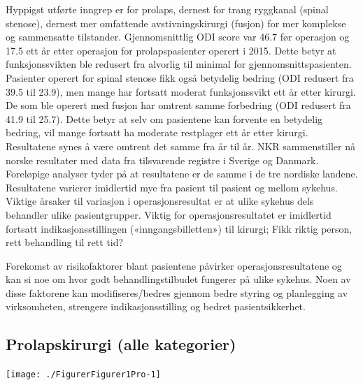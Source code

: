 \documentclass [norsk,a4paper,twoside]{article}\usepackage[]{graphicx}\usepackage[]{color}
\newenvironment{knitrout}{}{} %
\begin{document}
Hyppigst utførte inngrep er for prolaps, dernest for trang ryggkanal (spinal stenose),
dernest mer omfattende avstivningskirurgi (fusjon) for mer komplekse og
sammensatte tilstander. 
Gjennomsnittlig ODI score var 46.7 før operasjon og 17.5 ett år etter
operasjon for prolapspasienter operert i 2015. Dette betyr at funksjonssvikten ble redusert fra alvorlig til minimal for gjennomsnittspasienten. \\

Pasienter operert for spinal stenose fikk også
betydelig bedring (ODI redusert fra 39.5 til 23.9), men mange har 
fortsatt moderat funksjonssvikt ett år etter kirurgi. 
De som ble operert med fusjon har
omtrent samme forbedring (ODI redusert fra 41.9 til 25.7). 
Dette betyr at selv om
pasientene kan forvente en betydelig bedring, vil mange fortsatt ha moderate restplager
ett år etter kirurgi. Resultatene synes å være omtrent det samme fra år til år. NKR
sammenstiller nå norske resultater med data fra tilsvarende registre i Sverige og
Danmark. Foreløpige analyser tyder på at resultatene er de samme i
de tre nordiske landene.
Resultatene varierer imidlertid mye fra pasient til pasient og mellom sykehus.
Viktige årsaker til variasjon i operasjonsresultat er at ulike sykehus dels behandler
ulike pasientgrupper. Viktig for operasjonsresultatet er imidlertid fortsatt
indikasjonsstillingen («inngangsbilletten») til kirurgi; Fikk riktig person, rett
behandling til rett tid?

Forekomst av risikofaktorer blant pasientene påvirker operasjonsresultatene og kan
si noe om hvor godt behandlingstilbudet fungerer på ulike sykehus. Noen av disse
faktorene kan modifiseres/bedres gjennom bedre styring og planlegging av
virksomheten, strengere indikasjonsstilling og bedret pasientsikkerhet.














\subsection{Prolapskirurgi (alle kategorier)}

\begin{knitrout}
\color{fgcolor}

{\centering \texttt{[image: ./FigurerFigurer1Pro-1]} 

}



\end{knitrout}
\end{document}
